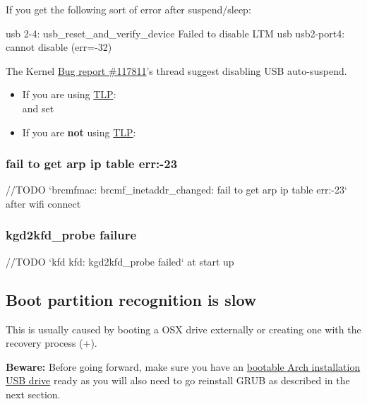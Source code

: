 If you get the following sort of error after suspend/sleep:
\vspace*{0.6em}
\begin{codeblock}
	usb 2-4: usb\_reset\_and\_verify\_device Failed to disable LTM\linebreak	
	usb usb2-port4: cannot disable (err=-32)
\end{codeblock}

The Kernel \href{https://bugzilla.kernel.org/show_bug.cgi?id=117811}{Bug report \#117811}'s thread suggest disabling USB auto-suspend.

\begin{itemize}[noitemsep,topsep=0pt,leftmargin=*]
	\item If you are using \href{https://wiki.archlinux.org/index.php/TLP}{TLP}:\\
	 and set 
	\item If you are \textbf{not} using \href{https://wiki.archlinux.org/index.php/TLP}{TLP}:\\
\end{itemize}

\subsubsection{fail to get arp ip table err:-23}

//TODO `brcmfmac: brcmf\_inetaddr\_changed: fail to get arp ip table err:-23` after wifi connect

\subsubsection{kgd2kfd\_probe failure}

//TODO `kfd kfd: kgd2kfd\_probe failed` at start up

\subsection{Boot partition recognition is slow}

This is usually caused by booting a OSX drive externally or creating one with the recovery process (+). 

\textbf{Beware:} Before going forward, make sure you have an \underline{bootable Arch installation USB drive} ready as you will also need to go reinstall GRUB as described in the next section.

